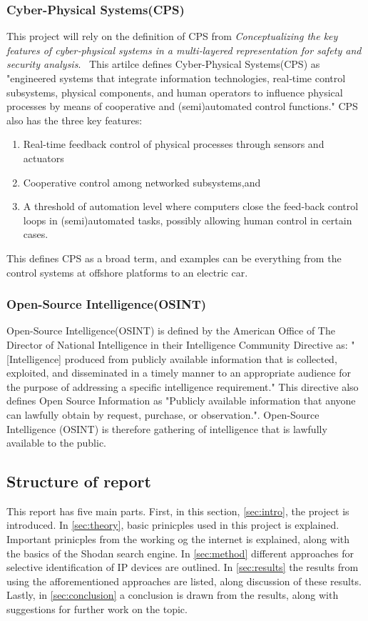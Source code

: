 \subsubsection{Cyber-Physical Systems(CPS)}\label{sec:cps}
This project will rely on the definition of CPS from \textit{Conceptualizing the key features of cyber‐physical systems in a multi‐layered representation for safety and security analysis}.~\cite{guzman_wied_kozine_lundteigen_2019}
This artilce defines Cyber-Physical Systems(CPS) as "engineered systems that integrate information technologies, real‐time control subsystems, physical components, and human operators to influence physical processes by means of cooperative and (semi)automated control functions." CPS also has the three key features:
\begin{enumerate}
    \item Real-time feedback control of physical processes through sensors and actuators  
    \item Cooperative control among networked subsystems,and
    \item A threshold of automation level where computers close the feed-back control loops in (semi)automated tasks, possibly allowing human control in certain cases. 
\end{enumerate}
This defines CPS as a broad term, and examples can be everything from the control systems at offshore platforms to an electric car. 

\subsubsection{Open-Source Intelligence(OSINT)}\label{sec:osint}
Open-Source Intelligence(OSINT) is defined by the American Office of The Director of National Intelligence in their Intelligence Community Directive as: "[Intelligence] produced from publicly available information that is collected, exploited, and disseminated in a timely manner to an appropriate audience for the purpose of addressing a specific intelligence requirement."\cite{directive_301} This directive also defines Open Source Information as "Publicly available information that anyone can lawfully obtain by request, purchase, or observation.". Open-Source Intelligence (OSINT) is therefore gathering of intelligence that is lawfully available to the public. 

\subsection{Structure of report}
This report has five main parts. First, in this section, \cref{sec:intro}, the project is introduced. In \cref{sec:theory}, basic prinicples used in this project is explained. Important prinicples from the working og the internet is explained, along with the basics of the Shodan search engine. In \cref{sec:method} different approaches for selective identification of IP devices are outlined. In \cref{sec:results} the results from using the afforementioned approaches are listed, along discussion of these results. Lastly, in \cref{sec:conclusion} a conclusion is drawn from the results, along with suggestions for further work on the topic.

\newpage
